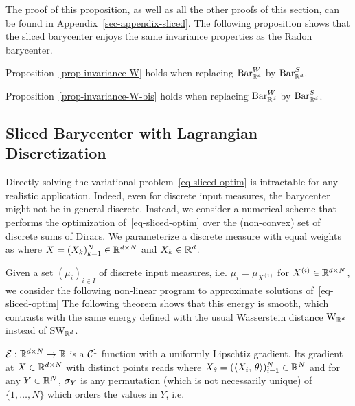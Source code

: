 The proof of this proposition, as well as all the other proofs of this section, can be found in Appendix~\ref{sec-appendix-sliced}. The following proposition shows that the sliced barycenter enjoys the same invariance properties as the Radon barycenter.

\begin{prop}\label{prop-invariance-Sliced}
	Proposition~\ref{prop-invariance-W} holds when replacing $\text{\upshape Bar}_{\mathbb{R}^d}^W$ by $\text{\upshape Bar}_{\mathbb{R}^d}^S$.
\end{prop}


\begin{prop}\label{prop-invariance-Sliced-bis}
	Proposition~\ref{prop-invariance-W-bis} holds when replacing $\text{\upshape Bar}_{\mathbb{R}^d}^W$ by $\text{\upshape Bar}_{\mathbb{R}^d}^S$.
\end{prop}



\subsection{Sliced Barycenter with Lagrangian Discretization}
\label{subsec-algorithm-lagrangian}


Directly solving the variational problem~\eqref{eq-sliced-optim} is in\-trac\-ta\-ble for any realistic application. Indeed, even for discrete input measures, the barycenter might not be in general discrete. Instead, we consider a numerical scheme that performs the optimization of~\eqref{eq-sliced-optim} over the (non-convex) set of discrete sums of Diracs. We parameterize a discrete measure with equal weights as
where $X = (X_k)_{k=1}^N \in \mathbb{R}^{d \times N}$ and $X_k \in \mathbb{R}^d$.

Given a set $(\mu_i)_{i \in I}$ of discrete input measures, i.e. $\mu_i = \mu_{X^{(i)}}$ for $X^{(i)} \in \mathbb{R}^{d \times N}$, we consider the following non-linear program to approximate solutions of~\eqref{eq-sliced-optim}
The following theorem shows that this energy is smooth, which contrasts with the same energy defined with the usual Wasserstein distance $\text{\upshape W}_{\mathbb{R}^d}$ instead of $\text{\upshape SW}_{\mathbb{R}^d}$.

\begin{thm}\label{thm-sliced-energy-grad}
	$\mathcal{E} : \mathbb{R}^{d\times N} \rightarrow \mathbb{R}$ is a $\mathcal{C}^1$ function with a uniformly Lipschtiz gradient. Its gradient at $X \in \mathbb{R}^{d \times N}$ with distinct points reads
	where $X_\theta = ( \langle X_i,\,\theta\rangle )_{i=1}^N \in \mathbb{R}^N$
	and for any $Y \in \mathbb{R}^N$, $\sigma_Y$ is any permutation (which is not necessarily unique) of $\{1,\ldots,N\}$ which orders the values in $Y$, i.e.
\end{thm}

